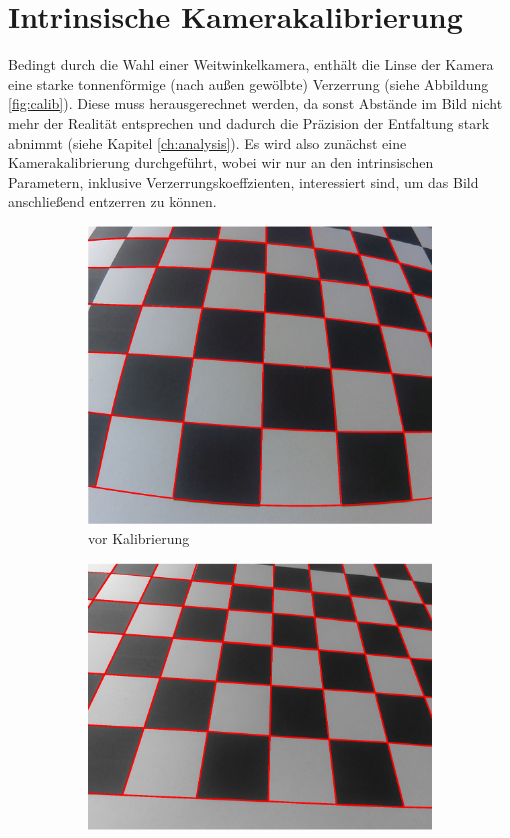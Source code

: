 \section{Intrinsische Kamerakalibrierung}
Bedingt durch die Wahl einer Weitwinkelkamera, enthält die Linse der Kamera eine starke tonnenförmige (nach außen gewölbte) Verzerrung (siehe Abbildung \ref{fig:calib}). Diese muss herausgerechnet werden, da sonst Abstände im Bild nicht mehr der Realität entsprechen und dadurch die Präzision der Entfaltung stark abnimmt (siehe Kapitel \ref{ch:analysis}). Es wird also zunächst eine Kamerakalibrierung durchgeführt, wobei wir nur an den intrinsischen Parametern, inklusive Verzerrungskoeffzienten, interessiert sind, um das Bild anschließend entzerren zu können. 


\begin{figure}[!htb]
	\centering
\begin{subfigure}{.5\textwidth}
	\centering
	\includegraphics[scale=.35]{images/calibrationRaspi.eps}
	\caption{vor Kalibrierung}
	\label{fig:calibDist}
\end{subfigure}%
\begin{subfigure}{.5\textwidth}
	\centering
	\includegraphics[scale=.4]{images/calibrationRaspi2.eps}

\end{subfigure}
\end{figure}
